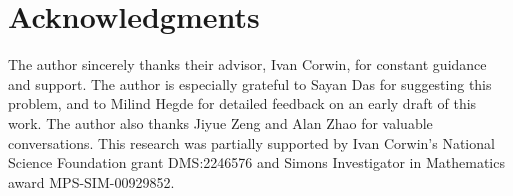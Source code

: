 \documentclass[11pt]{article}
\theoremstyle{definition}
\begin{document}
\section{Acknowledgments}
The author sincerely thanks their advisor, Ivan Corwin, for constant guidance and support. The author is especially grateful to Sayan Das for suggesting this problem, and to Milind Hegde for detailed feedback on an early draft of this work. The author also thanks Jiyue Zeng and Alan Zhao for valuable conversations. This research was partially supported by Ivan Corwin’s National Science Foundation grant DMS:2246576 and Simons Investigator in Mathematics award MPS-SIM-00929852.



\end{document}
